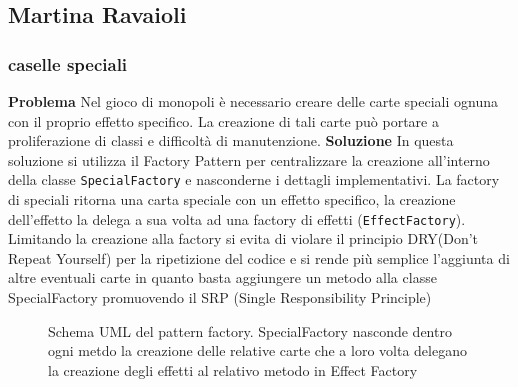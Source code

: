 \subsection{Martina Ravaioli}
\subsubsection{caselle speciali}

\textbf{Problema}\newline
Nel gioco di monopoli è necessario creare delle carte speciali ognuna con il proprio effetto specifico. La creazione di tali carte può portare a proliferazione di classi e difficoltà di manutenzione.\newline
\textbf{Soluzione}\newline
In questa soluzione si utilizza il Factory Pattern per centralizzare la creazione all’interno della classe \texttt{SpecialFactory} e nasconderne i dettagli implementativi.
La factory di speciali ritorna una carta speciale con un effetto specifico, la creazione dell’effetto la delega a sua volta ad una factory di effetti (\texttt{EffectFactory}).
Limitando la creazione alla factory si evita di violare il principio DRY(Don’t Repeat Yourself) per la ripetizione del codice e si rende più semplice l’aggiunta di altre eventuali carte  in quanto basta aggiungere un metodo alla classe SpecialFactory promuovendo il SRP (Single Responsibility Principle)

\begin{figure}[H]
    \centering
    \caption{Schema UML del pattern factory. SpecialFactory nasconde dentro ogni metdo la creazione delle relative carte che a loro volta delegano la creazione degli effetti al relativo metodo in Effect Factory}
    \label{img:ArchitectureDiagram-Pagina-4}
\end{figure}

